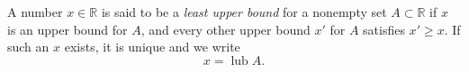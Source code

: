 A number $x \in \mathbb{R}$ is said to be a \textit{least upper bound} for a nonempty set $A \subset \mathbb{R}$ if $x$ is an upper bound for $A$, and every other upper bound $x'$ for $A$ satisfies $x' \geq x$. If such an $x$ exists, it is unique and we write
\begin{equation*}
x = \operatorname{lub} A.
\end{equation*}
